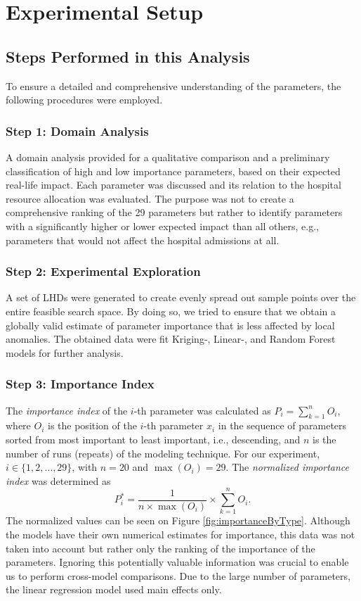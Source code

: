 \documentclass[conference]{IEEEtran}
\begin{document}
\section{Experimental Setup}\label{sec:experiments}

\subsection{Steps Performed in this Analysis}
To ensure a detailed and comprehensive understanding of the parameters, the following procedures were employed. 

\subsubsection*{Step 1: Domain Analysis}
A domain analysis provided for a qualitative comparison and a preliminary classification of high and low importance parameters, based on their expected real-life impact. Each parameter was discussed and its relation to the hospital resource allocation was evaluated. The purpose was not to create a comprehensive ranking of the 29 parameters but rather to identify parameters with a significantly higher or lower expected impact than all others, e.g., parameters that would not affect the hospital admissions at all.

\subsubsection*{Step 2: Experimental Exploration}
A set of \glspl{LHD} \cite{McKa79a} were generated to create evenly spread out sample points over the entire feasible search space.
By doing so, we tried to ensure that we obtain a globally valid estimate of parameter importance that is less affected by local anomalies.
The obtained data were fit Kriging-, Linear-, and Random Forest models for further analysis.

\subsubsection*{Step 3: Importance Index}
The \emph{importance index}\/ of the $i$-th parameter was calculated as $P_i = \sum_{k=1}^{n} O_i$,
where $O_i$ is the position of the $i$-th parameter $x_i$ in the sequence of parameters sorted from most important to least important, i.e., descending, 
and $n$ is the number of runs (repeats) of the modeling technique. 
For our experiment, $i \in \{ 1,2, \ldots, 29\}$, with $n = 20$ and $\max(O_i)= 29$.
The \emph{normalized importance index}\/ was determined  as 
\begin{equation}\label{eq:nimp}
    P^{\ast}_{i} = \frac{1}{n \times \max(O_i)}\times\sum_{k=1}^{n} O_i.
\end{equation} 
The normalized values can be seen on Figure \ref{fig:importanceByType}.
Although the models have their own numerical estimates for importance, this data was not taken into account but rather only the ranking of the importance of the parameters. Ignoring this potentially valuable information was crucial to enable us to perform cross-model comparisons.
Due to the large number of parameters, the linear regression model used main effects only. 
\end{document}

